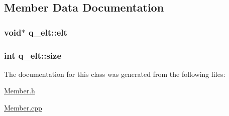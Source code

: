 \subsection{Member Data Documentation}
\hypertarget{classq__elt_af5c6e77b0120360ce34133329172710f}{}
\subsubsection[{elt}]{\setlength{\rightskip}{0pt plus 5cm}void$\ast$ q\+\_\+elt\+::elt}\label{classq__elt_af5c6e77b0120360ce34133329172710f}
\hypertarget{classq__elt_a3bce6f7fbb1df783283e8d7654ca63e0}{}
\subsubsection[{size}]{\setlength{\rightskip}{0pt plus 5cm}int q\+\_\+elt\+::size}\label{classq__elt_a3bce6f7fbb1df783283e8d7654ca63e0}


The documentation for this class was generated from the following files\+:\begin{DoxyCompactItemize}
\item 
\hyperlink{_member_8h}{Member.\+h}\item 
\hyperlink{_member_8cpp}{Member.\+cpp}\end{DoxyCompactItemize}
